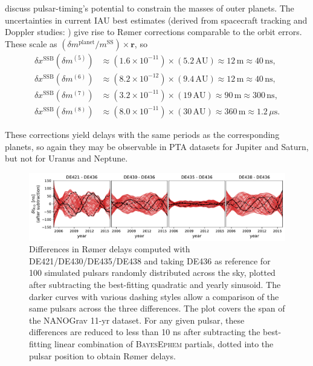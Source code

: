 \documentclass{aastex63}
\begin{document}
\citet{2010ApJ...720L.201C} discuss pulsar-timing's potential to constrain the masses of outer planets. The uncertainties in current IAU best estimates (derived from spacecraft tracking and Doppler studies: \citealt{iaumasses,jh+2000,2006AJ....132.2520J,2014AJ....148...76J,2009AJ....137.4322J}) give rise to R{\o}mer corrections comparable to the orbit errors. These scale as $(\delta m^\mathrm{planet}/m^\mathrm{SS}) \times \mathbf{r}$, so
%
\begin{equation}
    \begin{aligned}
    \delta x^\mathrm{SSB}(\delta m^{(5)}) & \approx (1.6 \!\times\! 10^{-11})\!\times\!
    (5.2 \, \mathrm{AU})
    \approx 12 \, \mathrm{m} \approx 40 \, \mathrm{ns}, \\
    \delta x^\mathrm{SSB}(\delta m^{(6)}) & \approx (8.2 \!\times\! 10^{-12}) \!\times\!
    (9.4 \, \mathrm{AU})
    \approx 12 \, \mathrm{m} \approx 40 \, \mathrm{ns}, \\
    \delta x^\mathrm{SSB}(\delta m^{(7)}) & \approx (3.2 \!\times\! 10^{-11}) \!\times\!
    (19 \, \mathrm{AU})
    \approx 90 \, \mathrm{m} \approx 300 \, \mathrm{ns}, \\
    \delta x^\mathrm{SSB}(\delta m^{(8)}) & \approx (8.0 \!\times\! 10^{-11}) \!\times\!
    (30 \, \mathrm{AU})
    \approx 360 \, \mathrm{m} \approx 1.2 \, \mu\mathrm{s}.
    \end{aligned}
\end{equation}

These corrections yield delays with the same periods as the corresponding planets, so again they may be observable in PTA datasets for Jupiter and Saturn, but not for Uranus and Neptune.
%
\begin{figure}[t]
    \centering
    \includegraphics[width=\columnwidth]{roemerdiff.pdf}
    \caption{Differences in R{\o}mer delays computed with DE421/DE430/DE435/DE438 and taking DE436 as reference for 100 simulated pulsars randomly distributed across the sky, plotted after subtracting the best-fitting quadratic and yearly sinusoid. The darker curves with various dashing styles allow a comparison of the same pulsars across the three differences. The plot covers the span of the NANOGrav 11-yr dataset.
    For any given pulsar, these differences are reduced to less than 10 ns after subtracting the best-fitting linear combination of \textsc{BayesEphem} partials, dotted into the pulsar position to obtain R{\o}mer delays.
    }
    \label{fig:Roemer}
\end{figure}
\end{document}
